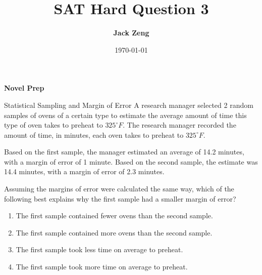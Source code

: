 \documentclass{beamer}
\title[SAT Hard Question]{\textbf{SAT Hard Question 3}}
\author{\textbf{Jack Zeng}}
\institute{\textcolor{white}{\textbf{Novel Prep}}}
\date{\today}
\begin{document}
\begin{frame}
    \titlepage
    \vfill
    \begin{flushright}
        \textcolor{purpleblue}{\Huge \textbf{Novel Prep}}
    \end{flushright}
\end{frame}


\begin{frame}
\end{frame}

\begin{frame}{Statistical Sampling and Margin of Error}
\small
A research manager selected 2 random samples of ovens of a certain type to estimate the average amount of time this type of oven takes to preheat to $325^\circ F$. The research manager recorded the amount of time, in minutes, each oven takes to preheat to $325^\circ F$.

Based on the first sample, the manager estimated an average of 14.2 minutes, with a margin of error of 1 minute. Based on the second sample, the estimate was 14.4 minutes, with a margin of error of 2.3 minutes.

Assuming the margins of error were calculated the same way, which of the following best explains why the first sample had a smaller margin of error?

\begin{enumerate}
    \item[A.] The first sample contained fewer ovens than the second sample.
    \item[B.] The first sample contained more ovens than the second sample.
    \item[C.] The first sample took less time on average to preheat.
    \item[D.] The first sample took more time on average to preheat.
\end{enumerate}
\end{frame}
\end{document}
